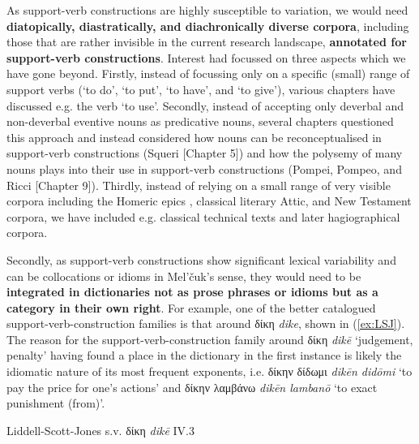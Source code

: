 \documentclass[output=paper,colorlinks,citecolor=brown]{langscibook}
\begin{document}
As support-verb constructions are highly susceptible to variation, we would need \textbf{diatopically, diastratically, and diachronically diverse corpora}, including those that are rather invisible in the current research landscape, \textbf{annotated for support-verb constructions}. Interest had focussed on three aspects which we have gone beyond. Firstly, instead of focussing only on a specific (small) range of support verbs (‘to do’, ‘to put’, ‘to have’, and ‘to give’), various chapters have discussed e.g. the verb ‘to use’. Secondly, instead of accepting only deverbal and non-deverbal eventive nouns as predicative nouns, several chapters questioned this approach and instead considered how nouns can be reconceptualised in support-verb constructions (Squeri [Chapter 5]) and how the polysemy of many nouns plays into their use in support-verb constructions (Pompei, Pompeo, and Ricci [Chapter 9]). Thirdly, instead of relying on a small range of very visible corpora including the Homeric epics \citep{bakkerLanguageHomer2020, vanseverenEhoVerbeSens1995, schutzeichelIndogermanischeFunktionsverbgefuege2014}, classical literary Attic, and New Testament corpora, we have included e.g. classical technical texts and later hagiographical corpora. 


Secondly, as support-verb constructions show significant lexical variability and can be collocations or idioms in Mel’čuk’s sense, they would need to be \textbf{integrated in dictionaries not as prose phrases or idioms but as a category in their own right}. For example, one of the better catalogued support-verb-construction families is that around δίκη \textit{dike}, shown in (\ref{ex:LSJ}). The reason for the support-verb-construction family around δίκη \textit{dikē} ‘judgement, penalty’ having found a place in the dictionary in the first instance is likely the idiomatic nature of its most frequent exponents, i.e. δίκην δίδωμι \textit{dikēn didōmi} ‘to pay the price for one's actions’ and δίκην λαμβάνω \textit{dikēn lambanō} ‘to exact punishment (from)’. 


\eanoraggedright\label{ex:LSJ}
Liddell-Scott-Jones s.v. δίκη \textit{dikē} IV.3
\end{document}
